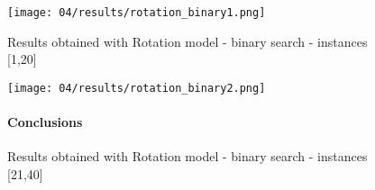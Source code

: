   \begin{figure}[H]
    \centering
    \texttt{[image: 04/results/rotation\_binary1.png]}
    \caption{
      Results obtained with Rotation model - binary search - instances [1,20]
    }
    \label{fig:SAT_results_rotation_binary1}
  \end{figure}

  \begin{figure}[H]
    \centering
    \texttt{[image: 04/results/rotation\_binary2.png]}
    \caption{
      Results obtained with Rotation model - binary search - instances [21,40]
    }
    \label{fig:SAT_results_rotation_binary2}

    \paragraph{Conclusions}

  \end{figure}